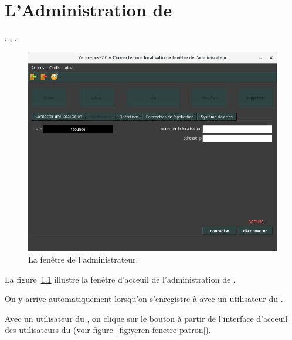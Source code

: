 \chapter{L'Administration de \yeren}\label{chap:administration-logiciel}

\utilisateurs: \lienadmin, \lienpatron.\\



\begin{figure}[!htpb]
\centering
\includegraphics[scale=0.45]{images/yeren-fenetre-administrateur.png}
\caption{La fen\^etre de l'administrateur.}
\label{fig:fenetre-administrateur}
\end{figure}

La figure~\ref{fig:fenetre-administrateur} illustre la
fen\^etre d'acceuil de l'administration de \yeren.

On y arrive automatiquement lorsqu'on s'enregistre
\`a \yeren avec un utilisateur du \role \admin.

Avec un utilisateur du \role \patron, on clique sur le
bouton  \`a partir de l'interface
d'acceuil des utilisateurs du \role \patron 
(voir figure~\ref{fig:yeren-fenetre-patron}).

\newpage


